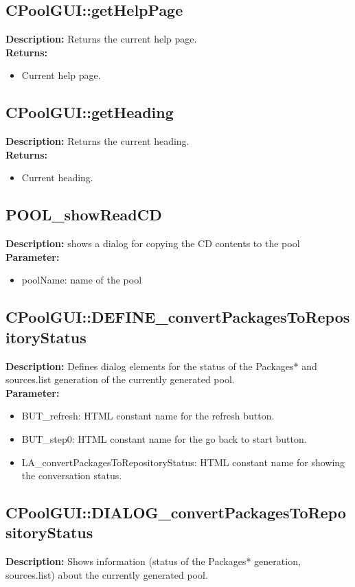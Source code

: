 \subsection{CPoolGUI::getHelpPage}
\textbf{Description:} Returns the current help page.\\
\textbf{Returns:}
\begin{itemize}
\item Current help page.
\end{itemize}

\subsection{CPoolGUI::getHeading}
\textbf{Description:} Returns the current heading.\\
\textbf{Returns:}
\begin{itemize}
\item Current heading.
\end{itemize}

\subsection{POOL\_showReadCD}
\textbf{Description:} shows a dialog for copying the CD contents to the pool\\
\textbf{Parameter:}
\begin{itemize}
\item poolName: name of the pool
\end{itemize}

\subsection{CPoolGUI::DEFINE\_convertPackagesToRepositoryStatus}
\textbf{Description:} Defines dialog elements for the status of the Packages*  and sources.list generation of the currently generated pool.\\
\textbf{Parameter:}
\begin{itemize}
\item BUT\_refresh: HTML constant name for the refresh button.
\item BUT\_step0: HTML constant name for the go back to start button.
\item LA\_convertPackagesToRepositoryStatus: HTML constant name for showing the conversation status.
\end{itemize}

\subsection{CPoolGUI::DIALOG\_convertPackagesToRepositoryStatus}
\textbf{Description:} Shows information (status of the Packages* generation, sources.list) about the currently generated pool.\\

